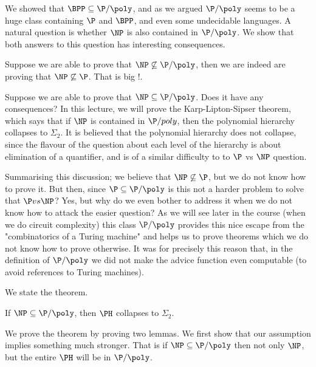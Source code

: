 
We showed that $\BPP \subseteq \P/\poly$, and as we argued $\P/\poly$ seems to be a huge class containing $\P$ and $\BPP$, and even some undecidable languages. A natural question is whether $\NP$ is also contained in $\P/\poly$. We show that both answers to this question has interesting consequences.

Suppose we are able to prove that $\NP \not\subseteq \P/\poly$, then we are indeed are proving that $\NP \not\subseteq \P$. That is big !.

Suppose we are able to prove that $\NP \subseteq \P/\poly$. Does it have any consequences?
In this lecture, we will prove the Karp-Lipton-Sipser theorem, which says that if $\NP$ is
contained in $\P/poly$, then the polynomial hierarchy collapses to $\Sigma_{2}$. It is believed
that the polynomial hierarchy does not collapse, since the flavour of the question about each level of the hierarchy is about elimination of a quantifier, and is of a similar difficulty to to $\P$ vs $\NP$ question. 

Summarising this discussion; we believe that $\NP \not\subseteq \P$, but we do not know how to prove it. But then, since $\P \subseteq \P/\poly$ is this not a harder problem to solve that $\P vs \NP$? Yes, but why do we even bother to address it when we do not know how to attack the easier question? As we will see later in the course (when we do circuit complexity) this class $\P/\poly$ provides this nice escape from the "combinatorics of a Turing machine" and helps us to prove theorems which we do not know how to prove otherwise. It was for precisely this reason that, in the definition of $\P/\poly$ we did not make the advice function even computable (to avoid references to Turing machines).

We state the theorem.
\begin{theorem}
If $\NP \subseteq \P/\poly$, then $\PH$ collapses to $\Sigma_2$.
\end{theorem}

We prove the theorem by proving two lemmas. We first show that our assumption implies something much stronger. That is if $\NP \subseteq \P/\poly$ then not only $\NP$, but the entire $\PH$ will be in $\P/\poly$.

